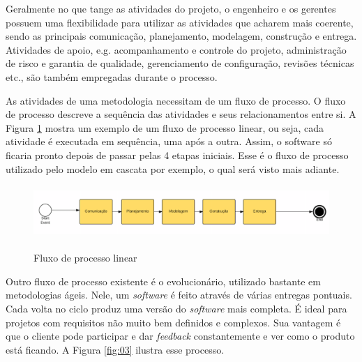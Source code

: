 
Geralmente no que tange as atividades do projeto, o engenheiro e os gerentes possuem uma flexibilidade para utilizar as atividades que acharem mais coerente, sendo as principais comunicação, planejamento, modelagem, construção e entrega. Atividades de apoio, e.g. acompanhamento e controle do projeto, administração de risco e garantia de qualidade, gerenciamento de configuração, revisões técnicas etc., são também empregadas durante o processo. \cite{pressman:11}

As atividades de uma metodologia necessitam de um fluxo de processo. O fluxo de processo descreve a sequência das atividades e seus relacionamentos entre si. A Figura \ref{fig:02} mostra um exemplo de um fluxo de processo linear, ou seja, cada atividade é executada em sequência, uma após a outra. Assim, o software só ficaria pronto depois de passar pelas 4 etapas iniciais. Esse é o fluxo de processo utilizado pelo modelo em cascata por exemplo, o qual será visto mais adiante. 

\begin{figure}[htb!]
\begin{center}
\caption{Fluxo de processo linear}
\label{fig:02}
\includegraphics[height=2cm]{assets/linear} \\
\end{center}
\end{figure}


Outro fluxo de processo existente é o evolucionário, utilizado bastante em metodologias ágeis. Nele, um \textit{software} é feito através de várias entregas pontuais. Cada volta no ciclo produz uma versão do \textit{software} mais completa. É ideal para projetos com requisitos não muito bem definidos e complexos. Sua vantagem é que o cliente pode participar e dar \textit{feedback} constantemente e ver como o produto está ficando. A Figura \ref{fig:03} ilustra esse processo.

